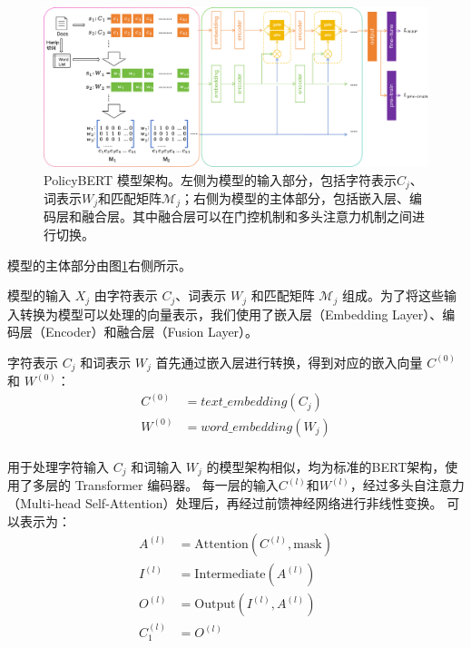 \documentclass[12pt, a4paper]{ctexart}
\begin{document}
\begin{figure}
    \centering
    \includegraphics[width=1\textwidth]{./images/model_structure.png}
    \caption{PolicyBERT 模型架构。左侧为模型的输入部分，包括字符表示$C_j$、词表示$W_j$和匹配矩阵${\mathcal{M}}_j$；右侧为模型的主体部分，包括嵌入层、编码层和融合层。其中融合层可以在门控机制和多头注意力机制之间进行切换。}
    \label{fig:policybert}
\end{figure}

模型的主体部分由图\ref{fig:policybert}右侧所示。

模型的输入 $X_j$ 由字符表示 $C_j$、词表示 $W_j$ 和匹配矩阵 ${\mathcal{M}}_j$ 组成。为了将这些输入转换为模型可以处理的向量表示，我们使用了嵌入层（Embedding Layer）、编码层（Encoder）和融合层（Fusion Layer）。

字符表示 $C_j$ 和词表示 $W_j$ 首先通过嵌入层进行转换，得到对应的嵌入向量 $C^{(0)}$ 和 $W^{(0)}$：
\begin{equation}
    \begin{split}
        C^{(0)} &= text\_embedding(C_j) \\
        W^{(0)} &= word\_embedding(W_j) \\
    \end{split}
\end{equation}

用于处理字符输入 $C_j$ 和词输入 $W_j$ 的模型架构相似，均为标准的BERT架构，使用了多层的 Transformer 编码器。
每一层的输入$C^{(l)}$和$W^{(l)}$，经过多头自注意力（Multi-head Self-Attention）处理后，再经过前馈神经网络进行非线性变换。
可以表示为：
\begin{equation}
    \begin{split}
        A^{(l)} &= \text{Attention}(C^{(l)}, \text{mask})\\
        I^{(l)} &= \text{Intermediate}(A^{(l)})\\
        O^{(l)} &= \text{Output}(I^{(l)}, A^{(l)})\\
        C^{(l)}_1 &= O^{(l)} \\
    \end{split}
\end{equation}
\end{document}
